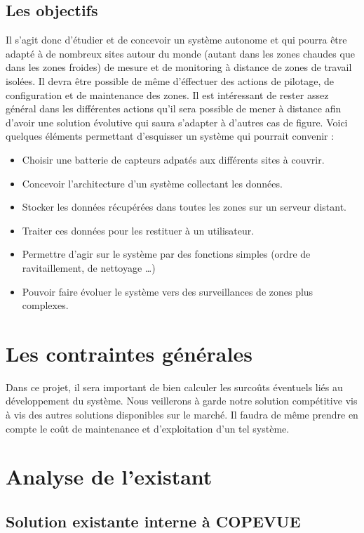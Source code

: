 \subsection{Les objectifs}
Il s'agit donc d'étudier et de concevoir un système autonome et qui pourra être adapté à de nombreux sites autour du monde (autant dans les zones chaudes que dans les zones froides) de mesure et de monitoring à distance de zones de travail isolées. Il devra être possible de même d'éffectuer des actions de pilotage, de configuration et de maintenance des zones. Il est intéressant de rester assez général dans les différentes actions qu'il sera possible de mener à distance afin d'avoir une solution évolutive qui saura s'adapter à d'autres cas de figure.
Voici quelques éléments permettant d'esquisser un système qui pourrait convenir :

\begin{itemize}
\item Choisir une batterie de capteurs adpatés aux différents sites à couvrir.
\item Concevoir l'architecture d'un système collectant les données.
\item Stocker les données récupérées dans toutes les zones sur un serveur distant.
\item Traiter ces données pour les restituer à un utilisateur.
\item Permettre d'agir sur le système par des fonctions simples (ordre de ravitaillement, de nettoyage …)
\item Pouvoir faire évoluer le système vers des surveillances de zones plus complexes.
\end{itemize}
    
\section{Les contraintes générales}
Dans ce projet, il sera important de bien calculer les surcoûts éventuels liés au développement du système. Nous veillerons à garde notre solution compétitive vis à vis des autres solutions disponibles sur le marché. Il faudra de même prendre en compte le coût de maintenance et d'exploitation d'un tel système.

\section{Analyse de l'existant}

\subsection{Solution existante interne à COPEVUE}

